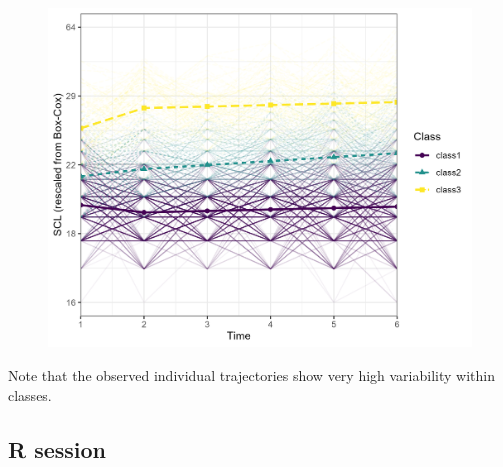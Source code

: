 \documentclass[
  man,floatsintext]{apa6}
\begin{document}
\begin{figure}
\includegraphics[width=0.5\linewidth]{appendices/plot_traj} \caption{ }\label{fig:unnamed-chunk-22}
\end{figure}

Note that the observed individual trajectories show very high
variability within classes.

\hypertarget{r-session}{%
\subsection{R session}\label{r-session}}
\end{document}
